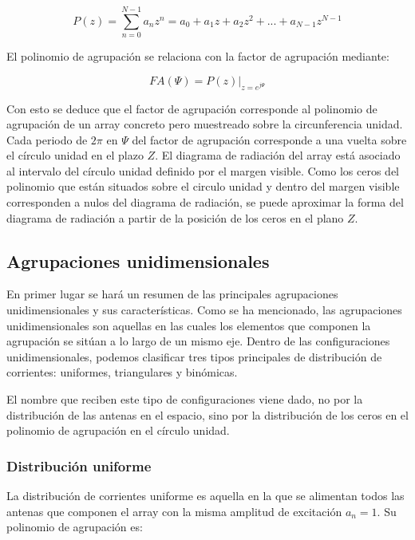 \begin{equation}
	P(z)=\sum_{n=0}^{N-1}a_{n}z^{n}=a_{0}+a_{1}z+a_{2}z^{2}+...+a_{N-1}z^{N-1}
	\label{eq:z}
\end{equation}

\par El polinomio de agrupación se relaciona con la factor de agrupación mediante:


\begin{equation}
	FA(\Psi)=P(z)|_{z=e^{j\Psi}}
	\label{eq:faz}
\end{equation}

\par Con esto se deduce que el factor de agrupación corresponde al polinomio de agrupación de un array concreto pero muestreado sobre la circunferencia unidad. Cada periodo de $2\pi$ en $\Psi$ del factor de agrupación corresponde a una vuelta sobre el círculo unidad en el plazo $Z$. El diagrama de radiación del array está asociado al intervalo del círculo unidad definido por el margen visible. Como los ceros del polinomio que están situados sobre el circulo unidad  y dentro del margen visible corresponden a nulos del diagrama de radiación, se puede aproximar la forma del diagrama de radiación a partir de la posición de los ceros en el plano $Z$. \cite{Cardama2002}

\subsection{Agrupaciones unidimensionales}
\par En primer lugar se hará un resumen de las principales agrupaciones unidimensionales y sus características. Como se ha mencionado, las agrupaciones unidimensionales son aquellas en las cuales los elementos que componen la agrupación se sitúan a lo largo de un mismo eje. Dentro de las configuraciones unidimensionales, podemos clasificar tres tipos principales de distribución de corrientes: uniformes, triangulares y binómicas. \cite{Cardama2002}
\\
\par El nombre que reciben este tipo de configuraciones viene dado, no por la distribución de las antenas en el espacio, sino por la distribución de los ceros en el polinomio de agrupación en el círculo unidad.

\subsubsection{Distribución uniforme}
\par La distribución de corrientes uniforme es aquella en la que se alimentan todos las antenas que componen el array con la misma amplitud de excitación $a_{n}=1$. Su polinomio de agrupación es: \cite{Cardama2002}

